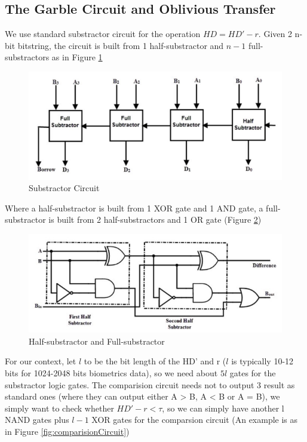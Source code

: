 \subsection{The Garble Circuit and Oblivious Transfer}
We use standard substractor circuit for the operation \(HD = HD' - r\). Given 2
n-bit bitstring, the circuit is built from 1 half-substractor and \(n-1\)
full-substractors as in Figure \ref{fig:substractor}

\begin{figure}[htbp!] 
  \centering    
  \includegraphics[width=1.0\textwidth]{Chapter7/Figs/Raster/subCircuit}
  \caption{Substractor Circuit}
  \label{fig:substractor}
\end{figure}

Where a half-substractor is built from 1 XOR gate and 1 AND gate, a full-substractor is built from 2 half-substractors and 1 OR gate (Figure \ref{fig:fullSubstractor})

\begin{figure}[htbp!] 
  \centering    
  \includegraphics[width=1.0\textwidth]{Chapter7/Figs/Raster/fullSubstractor}
  \caption{Half-substractor and Full-substractor}
  \label{fig:fullSubstractor}
\end{figure}

For our context, let \(l\) to be the bit length of the HD' and r (\(l\) is
typically 10-12 bits for 1024-2048 bits biometrics data), so we need about
\(5l\) gates for the substractor logic gates. The comparision circuit needs not
to output 3 result as standard ones (where they can output either A > B, A < B
or A = B), we simply want to check whether \(HD' - r < \tau\), so we can simply
have another l NAND gates plus \(l-1\) XOR gates for the comparsion circuit (An
example is as in Figure \ref{fig:comparisionCircuit})

